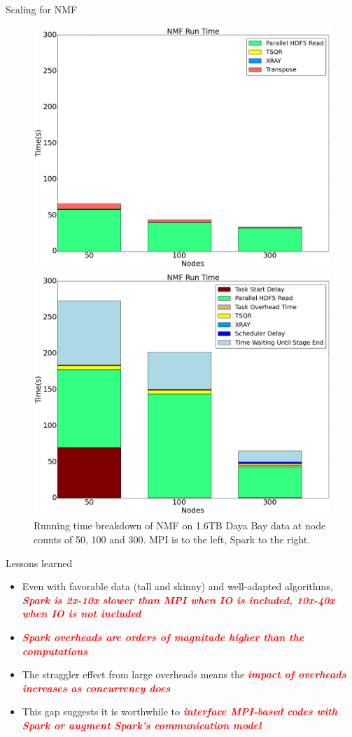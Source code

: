 \documentclass[xcolor=x11names,compress,ignorenonframetext,10pt]{beamer}
\renewcommand{\(}{\begin{columns}}
\renewcommand{\)}{\end{columns}}
\newcommand{\<}[1]{\begin{column}{#1}}
\renewcommand{\>}{\end{column}}
\newcommand{\redemphasis}[1]{\textbf{\textit{\textcolor{red}{#1}}}}
\begin{document}
\begin{frame}{Scaling for NMF}
\begin{figure}[th!]
\centering
\includegraphics[width=.5\textwidth]{figures/spark/mpi_nmf_big_scale.png}
\includegraphics[width=.5\textwidth]{figures/spark/spark_nmf.png}
\\
Running time breakdown of NMF on 1.6TB Daya Bay data at node counts of 50, 100 and 300. MPI 
is to the left, Spark to the right.
\end{figure}
\end{frame}

\begin{frame}{Lessons learned}
  \begin{itemize}
    \item Even with favorable data (tall and skinny) and well-adapted algorithms, \redemphasis{Spark is 2x-10x slower than MPI when IO is included, 10x-40x when IO is not included
}
  \item \redemphasis{Spark overheads are orders of magnitude higher than the computations} 

  \item The straggler effect from large overheads means the \redemphasis{impact of overheads increases as concurrency does}

  \item This gap suggests it is worthwhile to \redemphasis{interface MPI-based codes with Spark or augment Spark's communication model}
  \end{itemize}
\end{frame}
\end{document}
